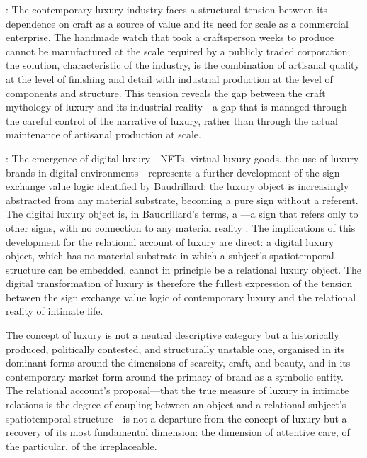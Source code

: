 : The contemporary luxury industry faces a structural tension between its dependence on craft as a source of value and its need for scale as a commercial enterprise. The handmade watch that took a craftsperson weeks to produce cannot be manufactured at the scale required by a publicly traded corporation; the solution, characteristic of the industry, is the combination of artisanal quality at the level of finishing and detail with industrial production at the level of components and structure. This tension reveals the gap between the craft mythology of luxury and its industrial reality---a gap that is managed through the careful control of the narrative of luxury, rather than through the actual maintenance of artisanal production at scale.

: The emergence of digital luxury---NFTs, virtual luxury goods, the use of luxury brands in digital environments---represents a further development of the sign exchange value logic identified by Baudrillard: the luxury object is increasingly abstracted from any material substrate, becoming a pure sign without a referent. The digital luxury object is, in Baudrillard's terms, a ---a sign that refers only to other signs, with no connection to any material reality \parencite{baudrillard1981}. The implications of this development for the relational account of luxury are direct: a digital luxury object, which has no material substrate in which a subject's spatiotemporal structure can be embedded, cannot in principle be a relational luxury object. The digital transformation of luxury is therefore the fullest expression of the tension between the sign exchange value logic of contemporary luxury and the relational reality of intimate life.

\begin{claim}
The concept of luxury is not a neutral descriptive category but a historically produced, politically contested, and structurally unstable one, organised in its dominant forms around the dimensions of scarcity, craft, and beauty, and in its contemporary market form around the primacy of brand as a symbolic entity. The relational account's proposal---that the true measure of luxury in intimate relations is the degree of coupling between an object and a relational subject's spatiotemporal structure---is not a departure from the concept of luxury but a recovery of its most fundamental dimension: the dimension of attentive care, of the particular, of the irreplaceable.
\end{claim}
